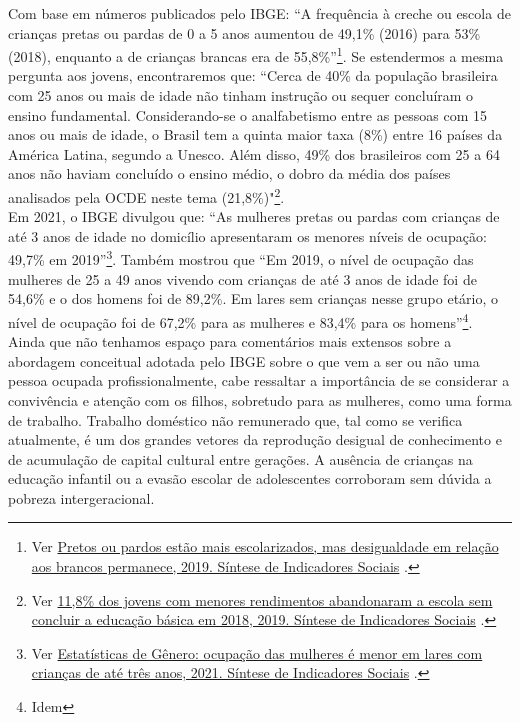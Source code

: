 \documentclass[14pt]{extarticle}
\begin{document}
Com base em números publicados pelo IBGE: ``A frequência à creche ou escola de crianças pretas ou pardas de 0 a 5 anos aumentou de 49,1\% (2016) para 53\% (2018), enquanto a de crianças brancas era de 55,8\%”\footnote{Ver \href{https://agenciadenoticias.ibge.gov.br/agencia-sala-de-imprensa/2013-agencia-de-noticias/releases/25989-pretos-ou-pardos-estao-mais-escolarizados-mas-desigualdade-em-relacao-aos-brancos-permanece}{Pretos ou pardos estão mais escolarizados, mas desigualdade em relação aos brancos permanece, 2019. Síntese de Indicadores Sociais} \citep{ibge3}.}. Se estendermos a mesma pergunta aos jovens, encontraremos que: ``Cerca de 40\% da população brasileira com 25 anos ou mais de idade não tinham instrução ou sequer concluíram o ensino fundamental. Considerando-se o analfabetismo entre as pessoas com 15 anos ou mais de idade, o Brasil tem a quinta maior taxa (8\%) entre 16 países da América Latina, segundo a Unesco. Além disso, 49\% dos brasileiros com 25 a 64 anos não haviam concluído o ensino médio, o dobro da média dos países analisados pela OCDE neste tema (21,8\%)"\footnote{Ver \href{https://agenciadenoticias.ibge.gov.br/agencia-sala-de-imprensa/2013-agencia-de-noticias/releases/25885-11-8-dos-jovens-com-menores-rendimentos-abandonaram-a-escola-sem-concluir-a-educacao-basica-em-2018}{11,8\% dos jovens com menores rendimentos abandonaram a escola sem concluir a educação básica em 2018, 2019. Síntese de Indicadores Sociais} \citep{ibge4}.}.\\ 

Em 2021, o IBGE divulgou que: ``As mulheres pretas ou pardas com crianças de até 3 anos de idade no domicílio apresentaram os menores níveis de ocupação: 49,7\% em 2019”\footnote{Ver \href{https://censoagro2017.ibge.gov.br/agencia-sala-de-imprensa/2013-agencia-de-noticias/releases/30172-estatisticas-de-genero-ocupacao-das-mulheres-e-menor-em-lares-com-criancas-de-ate-tres-anos#:~:text=Em\%20lares\%20sem\%20crian\%C3\%A7as\%20nessa,et\%C3\%A1rio\%20(83\%2C4\%25).}{Estatísticas de Gênero: ocupação das mulheres é menor em lares com crianças de até três anos, 2021. Síntese de Indicadores Sociais} \citep{ibge5}.}. Também mostrou que ``Em 2019, o nível de ocupação das mulheres de 25 a 49 anos vivendo com crianças de até 3 anos de idade foi de 54,6\% e o dos homens foi de 89,2\%. Em lares sem crianças nesse grupo etário, o nível de ocupação foi de 67,2\% para as mulheres e 83,4\% para os homens”\footnote{Idem}. Ainda que não tenhamos espaço para comentários mais extensos sobre a abordagem conceitual adotada pelo IBGE sobre o que vem a ser ou não uma pessoa ocupada profissionalmente, cabe ressaltar a importância de se considerar a convivência e atenção com os filhos, sobretudo para as mulheres, como uma forma de trabalho. Trabalho doméstico não remunerado que, tal como se verifica atualmente, é um dos grandes vetores da reprodução desigual de conhecimento e de acumulação de capital cultural entre gerações. A ausência de crianças na educação infantil ou a evasão escolar de adolescentes corroboram sem dúvida a pobreza intergeracional.\\ 
\end{document}
